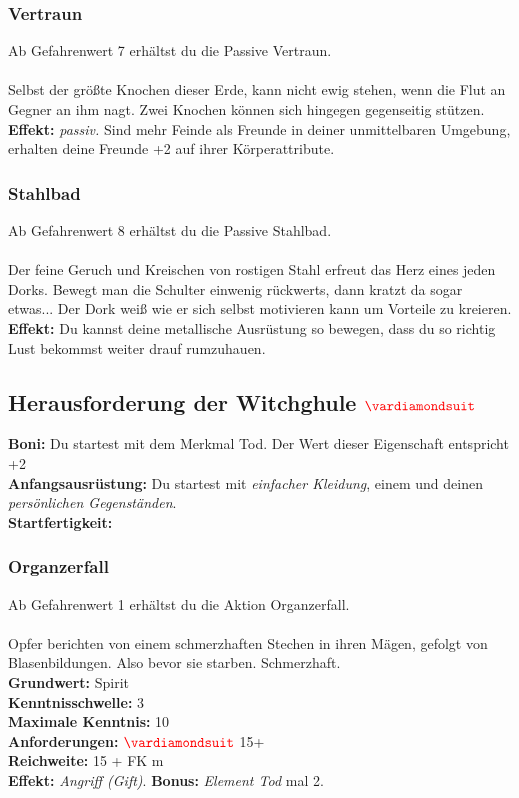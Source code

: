 \subsubsection*{ Vertraun} \label{sk:vertraun}
Ab Gefahrenwert 7 erhältst du die Passive Vertraun.\\
\\
Selbst der größte Knochen dieser Erde, kann nicht ewig stehen, wenn die Flut an Gegner an ihm nagt. Zwei Knochen können sich hingegen gegenseitig stützen.\\
\textbf{Effekt:} \textit{passiv.} Sind mehr Feinde als Freunde in deiner unmittelbaren Umgebung, erhalten deine Freunde +2 auf ihrer Körperattribute.

\subsubsection*{ Stahlbad} \label{sk:stahlbad}
Ab Gefahrenwert 8 erhältst du die Passive Stahlbad.\\
\\
Der feine Geruch und Kreischen von rostigen Stahl erfreut das Herz eines jeden Dorks. Bewegt man die Schulter einwenig rückwerts, dann kratzt da sogar etwas... Der Dork weiß wie er sich selbst motivieren kann um Vorteile zu kreieren.\\
\textbf{Effekt:} Du kannst deine metallische Ausrüstung so bewegen, dass du so richtig Lust bekommst weiter drauf rumzuhauen.


\subsection*{Herausforderung der Witchghule $\Karo{}$}
\textbf{Boni:} Du startest mit dem Merkmal  Tod. Der Wert dieser Eigenschaft entspricht +2 \\
\textbf{Anfangsausrüstung:} Du startest mit \textit{einfacher Kleidung}, einem  und deinen \textit{persönlichen Gegenständen}. \\
\textbf{Startfertigkeit:} 

\subsubsection*{ Organzerfall} \label{sk:organzerfall}
Ab Gefahrenwert 1 erhältst du die Aktion Organzerfall.\\
\\
Opfer berichten von einem schmerzhaften Stechen in ihren Mägen, gefolgt von Blasenbildungen. Also bevor sie starben. Schmerzhaft. \\
\textbf{Grundwert:} Spirit \\
\textbf{Kenntnisschwelle:} 3 \\
\textbf{Maximale Kenntnis:} 10 \\
\textbf{Anforderungen:} $\Karo{}$ 15+ \\
\textbf{Reichweite:} 15 + FK m \\
\textbf{Effekt:} \textit{Angriff (Gift)}. \textbf{Bonus:} \textit{Element Tod} mal 2.

